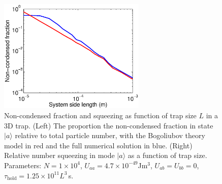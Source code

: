 \documentclass{iopart}
\begin{document}




\begin{figure}
  \centering
   \includegraphics[width=7cm]{figures/3D_Bog_mode_occupation_scaling.eps}
\caption{Non-condensed fraction and squeezing as function of trap size $L$ in a 3D trap. (Left) The proportion the non-condensed fraction in state $|a\rangle$ relative to total particle number, with the Bogoliubov theory model in red and the full numerical solution in blue. (Right) Relative number squeezing in mode $|a\rangle$ as a function of trap size. Parameters: $N=1\times 10^4$, $U_{aa} = 4.7\times 10^{-49}$Jm$^3$, $U_{ab}=U_{bb}=0$, $\tau_{\mathrm{hold}} = 1.25 \times 10^{11} L^3$\,s.}
 \label{fig3D_Bog_mode_occupation_scaling}
\end{figure}
\end{document}
